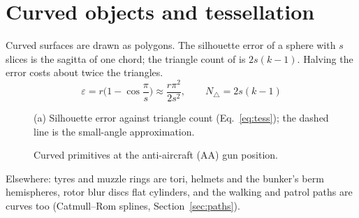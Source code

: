 \section{Curved objects and tessellation}
\label{sec:curved}
Curved surfaces are drawn as polygons. The silhouette error of a sphere with $s$ slices is the sagitta of one chord;
the triangle count of  is $2s(k-1)$. Halving the error costs about twice the triangles.
\begin{equation}
\varepsilon=r\Big(1-\cos\frac{\pi}{s}\Big)\approx\frac{r\pi^2}{2s^2},\qquad N_\triangle=2s(k-1)
\label{eq:tess}
\end{equation}

\begin{figure}[tbp]
\centering
{}
\caption{(a) Silhouette error against triangle count (Eq.~\eqref{eq:tess}); the dashed line is the small-angle
approximation.}
\label{fig:tess}
\end{figure}

\begin{figure}[htbp]
\centering
{}
\caption{Curved primitives at the anti-aircraft (AA) gun position.}
\label{fig:curved-scene}
\end{figure}

Elsewhere: tyres and muzzle rings are tori, helmets and the bunker's berm hemispheres, rotor blur discs flat cylinders,
and the walking and patrol paths are curves too (Catmull--Rom splines, Section~\ref{sec:paths}).

